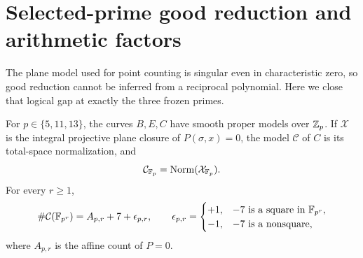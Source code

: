 \section{Selected-prime good reduction and arithmetic factors}\label{sec:arithmetic}

The plane model used for point counting is singular even in characteristic
zero, so good reduction cannot be inferred from a reciprocal polynomial.
Here we close that logical gap at exactly the three frozen primes.

\begin{theorem}\label{thm:good}
For $p\in\{5,11,13\}$, the curves $B,E,C$ have smooth proper models over
$\mathbb Z_p$.  If $\mathcal X$ is the integral projective plane closure of
$P(\sigma,x)=0$, the model $\mathcal C$ of $C$ is its total-space
normalization, and
\[
 \mathcal C_{\mathbb F_p}=\operatorname{Norm}(\mathcal X_{\mathbb F_p}).
\]
For every $r\geq1$,
\begin{equation}\label{eq:count-correction}
 \#\mathcal C(\mathbb F_{p^r})=A_{p,r}+7+\epsilon_{p,r},
 \qquad
 \epsilon_{p,r}=\begin{cases}
 +1,&-7\text{ is a square in }\mathbb F_{p^r},\\
 -1,&-7\text{ is a nonsquare},
 \end{cases}
\end{equation}
where $A_{p,r}$ is the affine count of $P=0$.
\end{theorem}


